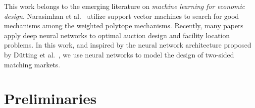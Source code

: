 \documentclass[11pt,letterpaper]{article}
\theoremstyle{definition}
\newcommand{\kibitz}[2]{\ifnum\Comments=1{\color{#1}{#2}}\fi}
\newcommand{\dcp}[1]{\kibitz{orange}{[DCP: #1]}}
\begin{document}
This work belongs to the emerging literature on \emph{machine learning for economic design}. Narasimhan et al.~\cite{NarasimhanParkes16a} utilize  support vector machines to search for good mechanisms among the weighted polytope mechanisms. Recently, many papers~\cite{deep-auction19, deep-budget, deep-facility, curry2020certifying,STZ19,rahme2020permutationequivariant} apply deep neural networks to optimal auction design and facility location problems. In this work, and inspired by the neural network architecture proposed by D\"{u}tting et al.~\cite{deep-auction19}, we use neural networks to model the design of two-sided matching markets. 

%
% 
%



\vspace{-5pt}
\section{Preliminaries}
\label{sec:prelim}
\vspace{-5pt}


\end{document}
